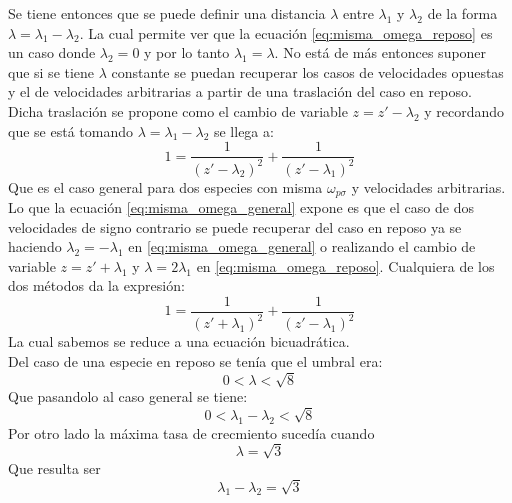 \documentclass[12pt]{article}
\begin{document}
Se tiene entonces que se puede definir una distancia $\lambda$ entre $\lambda_1$ y $\lambda_2$ de la forma $\lambda = \lambda_1 - \lambda_2$. La cual permite ver que la ecuación \ref{eq:misma_omega_reposo} es un caso donde $\lambda_2 =0$ y por lo tanto $\lambda_1 = \lambda$. No está de más entonces suponer que si se tiene $\lambda$ constante se puedan recuperar los casos de velocidades opuestas y el de velocidades arbitrarias a partir de una traslación del caso en reposo.\\
Dicha traslación se propone como el cambio de variable $z=z'-\lambda_2$ y recordando que se está tomando $\lambda= \lambda_1 - \lambda_2$ se llega a:
\begin{equation}
\label{eq:misma_omega_general}
1 = \frac{1}{(z'-\lambda_2)^2} + \frac{1}{(z'-\lambda_1)^2}
\end{equation}
Que es el caso general para dos especies con misma $\omega_{p\sigma}$ y velocidades arbitrarias. Lo que la ecuación \ref{eq:misma_omega_general} expone es que el caso de dos velocidades de signo contrario se puede recuperar del caso en reposo ya se haciendo $\lambda_2 = -\lambda_1$ en \ref{eq:misma_omega_general} o realizando el cambio de variable $z=z' +\lambda_1$ y $\lambda= 2\lambda_1$ en \ref{eq:misma_omega_reposo}. Cualquiera de los dos métodos da la expresión:
\begin{equation}
\label{eq:misma_omega_opuestas_cambio}
1 = \frac{1}{(z'+\lambda_1)^2} + \frac{1}{(z'-\lambda_1)^2}
\end{equation}
La cual sabemos se reduce a una ecuación bicuadrática.\\
Del caso de una especie en reposo se tenía que el umbral era:
\begin{equation}
0<\lambda<\sqrt{8}
\end{equation}
Que pasandolo al caso general se tiene:
\begin{equation}
0<\lambda_1 - \lambda_2 <\sqrt{8}
\end{equation}
Por otro lado la máxima tasa de crecmiento sucedía cuando
\begin{equation}
\lambda=\sqrt{3}
\end{equation}
Que resulta ser 
\begin{equation}
\lambda_1 - \lambda_2 = \sqrt{3}
\end{equation}
%
\end{document}
